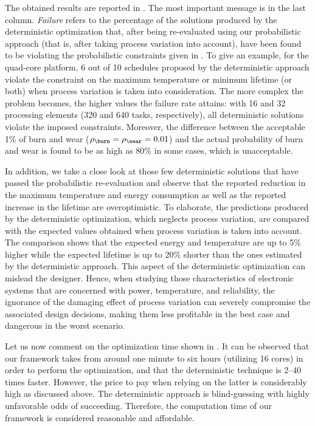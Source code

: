 The obtained results are reported in . The
most important message is in the last column. \emph{Failure} refers to the
percentage of the solutions produced by the deterministic optimization that,
after being re-evaluated using our probabilistic approach (that is, after taking
process variation into account), have been found to be violating the
probabilistic constraints given in . To
give an example, for the quad-core platform, 6 out of 10 schedules proposed by
the deterministic approach violate the constraint on the maximum temperature or
minimum lifetime (or both) when process variation is taken into consideration.
The more complex the problem becomes, the higher values the failure rate
attains: with 16 and 32 processing elements (320 and 640 tasks, respectively),
all deterministic solutions violate the imposed constraints. Moreover, the
difference between the acceptable 1\% of burn and wear ($\rho_\burn = \rho_\wear
= 0.01$) and the actual probability of burn and wear is found to be as high as
80\% in some cases, which is unacceptable.

In addition, we take a close look at those few deterministic solutions that have
passed the probabilistic re-evaluation and observe that the reported reduction
in the maximum temperature and energy consumption as well as the reported
increase in the lifetime are overoptimistic. To elaborate, the predictions
produced by the deterministic optimization, which neglects process variation,
are compared with the expected values obtained when process variation is taken
into account. The comparison shows that the expected energy and temperature are
up to 5\% higher while the expected lifetime is up to 20\% shorter than the ones
estimated by the deterministic approach. This aspect of the deterministic
optimization can mislead the designer. Hence, when studying those
characteristics of electronic systems that are concerned with power,
temperature, and reliability, the ignorance of the damaging effect of process
variation can severely compromise the associated design decisions, making them
less profitable in the best case and dangerous in the worst scenario.

Let us now comment on the optimization time shown in
. It can be observed that our framework takes
from around one minute to six hours (utilizing 16 cores) in order to perform the
optimization, and that the deterministic technique is 2--40 times faster.
However, the price to pay when relying on the latter is considerably high as
discussed above. The deterministic approach is blind-guessing with highly
unfavorable odds of succeeding. Therefore, the computation time of our framework
is considered reasonable and affordable.

